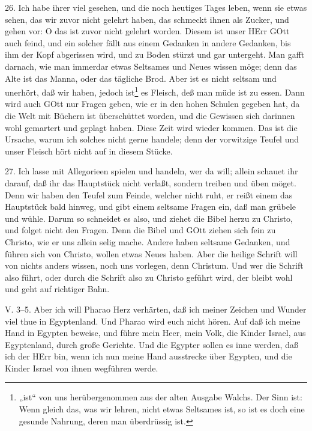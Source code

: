 26. Ich habe ihrer viel gesehen, und die noch heutiges Tages leben, wenn sie etwas sehen, das wir zuvor nicht gelehrt haben, das schmeckt ihnen als Zucker, und gehen vor: O das ist zuvor nicht gelehrt worden. Diesem ist unser HErr GOtt auch feind, und ein solcher fällt aus einem Gedanken in andere Gedanken, bis ihm der Kopf abgerissen wird, und zu Boden stürzt und gar untergeht. Man gafft darnach, wie man immerdar etwas Seltsames und Neues wissen möge; denn das Alte ist das Manna, oder das tägliche Brod. Aber ist es nicht seltsam und unerhört, daß wir haben, jedoch ist\footnote{„ist“ von uns herübergenommen aus der alten Ausgabe Walchs. Der Sinn ist: Wenn gleich das, was wir lehren, nicht etwas Seltsames ist, so ist es doch eine gesunde Nahrung, deren man überdrüssig ist.} es Fleisch, deß man müde ist zu essen. Dann wird auch GOtt nur Fragen geben, wie er in den hohen Schulen gegeben hat, da die Welt mit Büchern ist überschüttet worden, und die Gewissen sich darinnen wohl gemartert und geplagt haben. Diese Zeit wird wieder kommen. Das ist die Ursache, warum ich solches nicht gerne handele; denn der vorwitzige Teufel und unser Fleisch hört nicht auf in diesem Stücke.

27. Ich lasse mit Allegorieen spielen und handeln, wer da will; allein schauet ihr darauf, daß ihr das Hauptstück nicht verlaßt, sondern treiben und üben möget. Denn wir haben den Teufel zum Feinde, welcher nicht ruht, er reißt einem das Hauptstück bald hinweg, und gibt einem seltsame Fragen ein, daß man grübele und wühle. Darum so schneidet es also, und ziehet die Bibel herzu zu Christo, und folget nicht den Fragen. Denn die Bibel und GOtt ziehen sich fein zu Christo, wie er uns allein selig mache. Andere haben seltsame Gedanken, und führen sich von Christo, wollen etwas Neues haben. Aber die heilige Schrift will von nichts anders wissen, noch uns vorlegen, denn Christum. Und wer die Schrift also führt, oder durch die Schrift also zu Christo geführt wird, der bleibt wohl und geht auf richtiger Bahn.

\begin{schriftzitat}
V. 3–5. Aber ich will Pharao Herz verhärten, daß ich meiner Zeichen und Wunder viel thue in Egyptenland. Und Pharao wird euch nicht hören. Auf daß ich meine Hand in Egypten beweise, und führe mein Heer, mein Volk, die Kinder Israel, aus Egyptenland, durch große Gerichte. Und die Egypter sollen es inne werden, daß ich der HErr bin, wenn ich nun meine Hand ausstrecke über Egypten, und die Kinder Israel von ihnen wegführen werde.
\end{schriftzitat}

